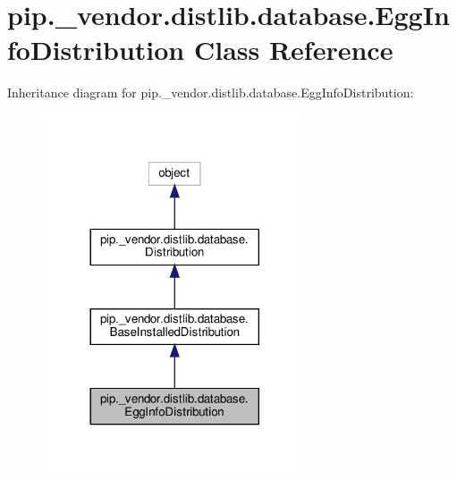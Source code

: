 \hypertarget{classpip_1_1__vendor_1_1distlib_1_1database_1_1EggInfoDistribution}{}\section{pip.\+\_\+vendor.\+distlib.\+database.\+Egg\+Info\+Distribution Class Reference}
\label{classpip_1_1__vendor_1_1distlib_1_1database_1_1EggInfoDistribution}


Inheritance diagram for pip.\+\_\+vendor.\+distlib.\+database.\+Egg\+Info\+Distribution\+:
\nopagebreak
\begin{figure}[H]
\begin{center}
\leavevmode
\includegraphics[width=221pt]{classpip_1_1__vendor_1_1distlib_1_1database_1_1EggInfoDistribution__inherit__graph}
\end{center}
\end{figure}


